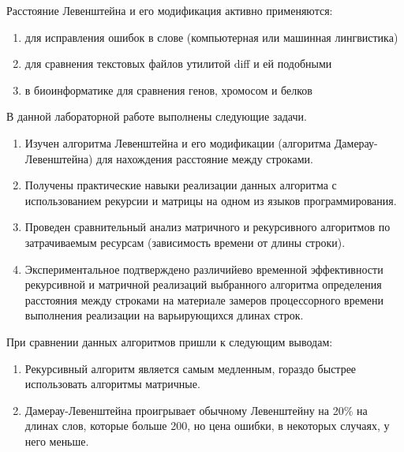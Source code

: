 \documentclass[a4paper,14pt]{article} %
\begin{document}
	Расстояние Левенштейна и его модификация активно применяются:
	\begin{enumerate}
		\item для исправления ошибок в слове (компьютерная или машинная лингвистика)
		\item для сравнения текстовых файлов утилитой diff и ей подобными
		\item в биоинформатике для сравнения генов, хромосом и белков
	\end{enumerate}
	
	\hfill
	
	В данной лабораторной работе выполнены следующие задачи. 
        \begin{enumerate} 
		\item Изучен алгоритма Левенштейна и его модификации (алгоритма Дамерау-Левенштейна) для нахождения расстояние между строками. 
		\item Получены практические навыки реализации данных алгоритма с использованием рекурсии и матрицы на одном из языков программирования. 
		\item Проведен сравнительный анализ матричного и рекурсивного алгоритмов по затрачиваемым ресурсам (зависимость времени от длины строки). 
		\item Экспериментальное подтверждено различийево временной эффективности рекурсивной и матричной реализаций выбранного алгоритма определения расстояния между строками на материале замеров процессорного времени выполнения реализации на варьирующихся длинах строк.
	\end{enumerate} 
	
	При сравнении данных алгоритмов пришли к следующим выводам:
	\begin{enumerate}
 		\item Рекурсивный алгоритм является самым медленным, гораздо быстрее использовать алгоритмы матричные.   
 		\item Дамерау-Левенштейна проигрывает обычному Левенштейну на 20\% на длинах слов, которые больше 200, но цена ошибки, в некоторых случаях, у него меньше.
	\end{enumerate}

 	\newpage
\end{document}
